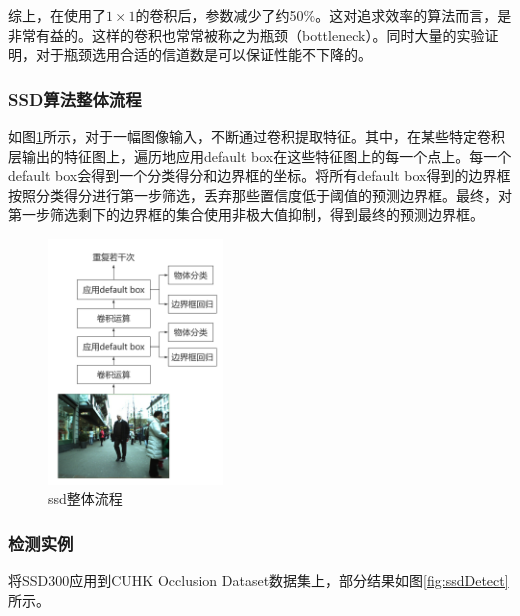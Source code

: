 \documentclass[12pt,a4paper,titlepage]{article}
\begin{document}
综上，在使用了$1\times 1$的卷积后，参数减少了约50\%。这对追求效率的算法而言，是非常有益的。这样的卷积也常常被称之为瓶颈（bottleneck）。同时大量的实验证明，对于瓶颈选用合适的信道数是可以保证性能不下降的。

\subsubsection{SSD算法整体流程}
如图\ref{fig:ssdProcess}所示，对于一幅图像输入，不断通过卷积提取特征。其中，在某些特定卷积层输出的特征图上，遍历地应用default box在这些特征图上的每一个点上。每一个default box会得到一个分类得分和边界框的坐标。将所有default box得到的边界框按照分类得分进行第一步筛选，丢弃那些置信度低于阈值的预测边界框。最终，对第一步筛选剩下的边界框的集合使用非极大值抑制，得到最终的预测边界框。

\begin{figure}[h]
\centering
\includegraphics[height=6.5cm]{img/ssd_process.png}
\caption{ssd整体流程}
\label{fig:ssdProcess}
\end{figure}

\subsubsection{检测实例}
将SSD300应用到CUHK Occlusion Dataset数据集上，部分结果如图\ref{fig:ssdDetect}所示。
\end{document}
